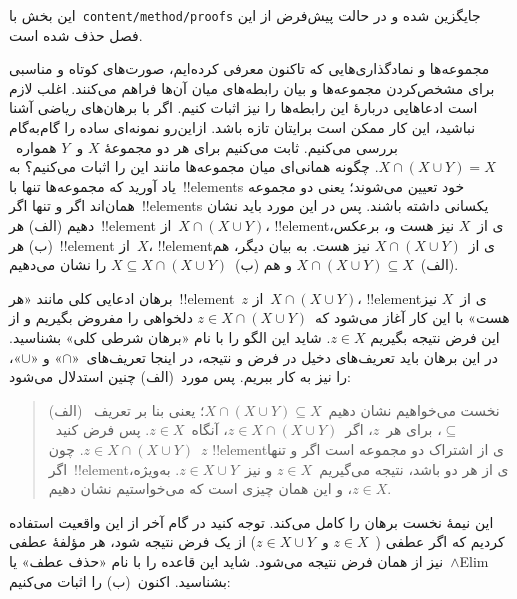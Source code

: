 \documentclass[../../../include/open-logic-section]{subfiles}
\begin{document}

\begin{editorial}
این بخش با~\verb|content/method/proofs| جایگزین شده و در حالت پیش‌فرض از
این فصل حذف شده است.
\end{editorial}

\begin{explain}
مجموعه‌ها و نمادگذاری‌هایی که تاکنون معرفی کرده‌ایم، صورت‌های کوتاه و
مناسبی برای مشخص‌کردن مجموعه‌ها و بیان رابطه‌های میان آن‌ها فراهم می‌کنند.
اغلب لازم است ادعاهایی دربارهٔ این رابطه‌ها را نیز اثبات کنیم. اگر با
برهان‌های ریاضی آشنا نباشید، این کار ممکن است برایتان تازه باشد. ازاین‌رو
نمونه‌ای ساده را گام‌به‌گام بررسی می‌کنیم. ثابت می‌کنیم برای هر دو مجموعهٔ
$X$ و~$Y$ همواره~$X \cap (X \cup Y) = X$. چگونه همانی‌ای میان مجموعه‌ها
مانند این را اثبات می‌کنیم؟ به یاد آورید که مجموعه‌ها تنها با~!!{element}s
خود تعیین می‌شوند؛ یعنی دو مجموعه همان‌اند اگر و تنها اگر~!!{element}s
یکسانی داشته باشند. پس در این مورد باید نشان دهیم (الف) هر~!!{element}
از~$X \cap (X \cup Y)$، !!{element}ی از~$X$ نیز هست و، برعکس، (ب)
هر~!!{element} از~$X$، !!{element}ی از~$X \cap (X \cup Y)$ نیز هست.
به بیان دیگر، هم (الف)~$X \cap (X \cup Y) \subseteq X$ و هم
(ب)~$X \subseteq X \cap (X \cup Y)$ را نشان می‌دهیم.

برهان ادعایی کلی مانند «هر~!!{element}~$z$ از~$X \cap (X \cup Y)$،
!!{element}ی از~$X$ نیز هست» با این کار آغاز می‌شود که~$z \in
X \cap (X \cup Y)$ دلخواهی را مفروض بگیریم و از این فرض نتیجه بگیریم
$z \in X$. شاید این الگو را با نام «برهان شرطی کلی» بشناسید. در این
برهان باید تعریف‌های دخیل در فرض و نتیجه، در اینجا تعریف‌های~«$\cap$» و
«$\cup$»، را نیز به کار ببریم. پس مورد~(الف) چنین استدلال می‌شود:

\begin{quote}
(الف) نخست می‌خواهیم نشان دهیم~$X \cap (X \cup Y) \subseteq X$؛ یعنی
بنا بر تعریف~$\subseteq$، برای هر~$z$، اگر~$z \in X \cap (X \cup Y)$،
آنگاه~$z \in X$. پس فرض کنید~$z \in X \cap (X \cup Y)$. چون~$z$
!!{element}ی از اشتراک دو مجموعه است اگر و تنها اگر~!!{element}ی از هر
دو باشد، نتیجه می‌گیریم~$z \in X$ و نیز~$z \in X \cup Y$. به‌ویژه،
$z \in X$، و این همان چیزی است که می‌خواستیم نشان دهیم.
\end{quote}

این نیمهٔ نخست برهان را کامل می‌کند. توجه کنید در گام آخر از این واقعیت
استفاده کردیم که اگر عطفی (~$z \in X$ و~$z \in X \cup Y$) از یک فرض
نتیجه شود، هر مؤلفهٔ عطفی نیز از همان فرض نتیجه می‌شود. شاید این قاعده را
با نام «حذف عطف» یا~$\land$Elim بشناسید. اکنون~(ب) را اثبات می‌کنیم:


\end{explain}
\end{document}
